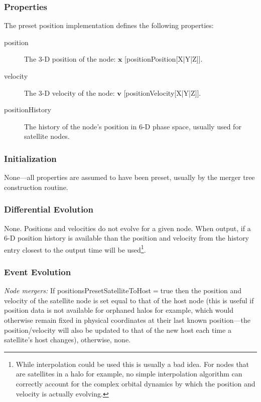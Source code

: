 \subsubsection{Properties}

The preset position implementation defines the following properties:
\begin{description}
 \item [{\normalfont \ttfamily position}] The 3-D position of the node: $\mathbf{x}$ [{\normalfont \ttfamily positionPosition[X|Y|Z]}].
 \item [{\normalfont \ttfamily velocity}] The 3-D velocity of the node: $\mathbf{v}$ [{\normalfont \ttfamily positionVelocity[X|Y|Z]}].
 \item [{\normalfont \ttfamily positionHistory}] The history of the node's position in 6-D phase space, usually used for satellite nodes.
\end{description}

\subsubsection{Initialization}

None---all properties are assumed to have been preset, usually by the merger tree construction routine.

\subsubsection{Differential Evolution}

None. Positions and velocities do not evolve for a given node. When output, if a 6-D position history is available than the position and velocity from the history entry closest to the output time will be used\footnote{While interpolation could be used this is usually a bad idea. For nodes that are satellites in a halo for example, no simple interpolation algorithm can correctly account for the complex orbital dynamics by which the position and velocity is actually evolving.}.

\subsubsection{Event Evolution}

\noindent\emph{Node mergers:} If {\normalfont \ttfamily positionsPresetSatelliteToHost}$=${\normalfont \ttfamily true} then the position and velocity of the satellite node is set equal to that of the host node (this is useful if position data is not available for orphaned halos for example, which would otherwise remain fixed in physical coordinates at their last known position---the position/velocity will also be updated to that of the new host each time a satellite's host changes), otherwise, none.\\

